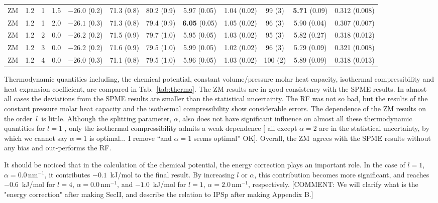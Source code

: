 \documentclass[a4paper,preprint,unsortedaddress,onecolumn,fleqn]{revtex4}
\begin{document}
\begin{sidewaystable}
\begin{tabular*}{0.99\textwidth}{@{\extracolsep{\fill}}cccc cccccccc}
    ZM          &1.2 & 1  &1.5 & $-26.0$ (0.2) & 71.3 (0.8)  &80.2 (0.9)           & 5.97 (0.05)               &1.04 (0.02)          & 99 (3)          & \textbf{5.71} (0.09)&        {0.312} (0.008)\\ 
    ZM          &1.2 & 1  &2.0 & $-26.1$ (0.3) & 71.3 (0.8)  &79.4 (0.9)           & \textbf{6.05} (0.05)      &1.05 (0.02)          & 96 (3)          &        {5.90} (0.04)&        {0.307} (0.007)\\\hline
    ZM          &1.2 & 2  &0.0 & $-26.2$ (0.2) & 71.5 (0.9)  &79.7 (1.0)           & 5.95 (0.05)               &1.03 (0.02)          & 95 (3)          &         5.82  (0.27)&         0.318  (0.012)\\
    ZM          &1.2 & 3  &0.0 & $-26.2$ (0.2) & 71.6 (0.9)  &79.5 (1.0)           & 5.99 (0.05)               &1.02 (0.02)          & 96 (3)          &         5.79  (0.09)&         0.321  (0.008)\\
    ZM          &1.2 & 4  &0.0 & $-26.0$ (0.3) & 71.1 (0.8)  &79.5 (1.0)           & 5.96 (0.05)               &1.03 (0.02)          &100 (2)          &         5.89  (0.09)&         0.318  (0.013)\\
    \hline\hline
  \end{tabular*}
  \label{tab:thermo}
\end{sidewaystable}

Thermodynamic quantities including, the chemical potential, constant
volume/pressure molar heat capacity, isothermal compressibility and heat
expansion coefficient, are compared in Tab.~\ref{tab:thermo}. The ZM results
are in good consistency with the SPME results. In almost all cases the
deviations from the SPME results are smaller than the statistical
uncertainty. The RF was not so bad, but the results of the constant pressure
molar heat capacity and the isothermal compressibility show considerable
errors. The dependence of the ZM results on the order\ $l$\ is {\color{red}
little}. Although the splitting parameter, $\alpha $, also does not have
significant influence on almost all these thermodynamic quantities for $l=1$%
, only the isothermal compressibility admits a weak dependence [{\color{red}
all except $\alpha =2$ are in the statistical uncertainty, by which we
cannot say $\alpha =1$ is optimal... I remove \textquotedblleft and $\alpha
=1$ seems optimal\textquotedblright } {\color{blue} OK}]. Overall, the ZM\
agrees with the SPME results without any bias and out-performs the RF.

{\color{red} It should be noticed that in the calculation of the chemical
potential, the energy correction plays an important role. In the case of $%
l=1 $, $\alpha =0.0\,\text{nm}^{-1}$, it contributes $-0.1$~kJ/mol to the
final result. By increasing $l$ or $\alpha $, this contribution becomes more
significant, and reaches $-0.6$~kJ/mol for $l=4$, $\alpha =0.0\,\text{nm}%
^{-1}$, and $-1.0$~kJ/mol for $l=1$, $\alpha =2.0\,\text{nm}^{-1}$,
respectively. [\color{blue}COMMENT: We will clarify what is the "energy
correction" after making SecII, and describe the relation to IPSp after
making Appendix B.] }
\end{document}
